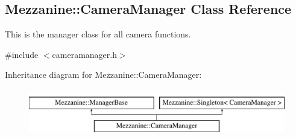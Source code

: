 \hypertarget{classMezzanine_1_1CameraManager}{
\subsection{Mezzanine::CameraManager Class Reference}
\label{classMezzanine_1_1CameraManager}
}


This is the manager class for all camera functions.  




{\ttfamily \#include $<$cameramanager.h$>$}

Inheritance diagram for Mezzanine::CameraManager:\begin{figure}[H]
\begin{center}
\leavevmode
\includegraphics[height=2.000000cm]{classMezzanine_1_1CameraManager}
\end{center}
\end{figure}
